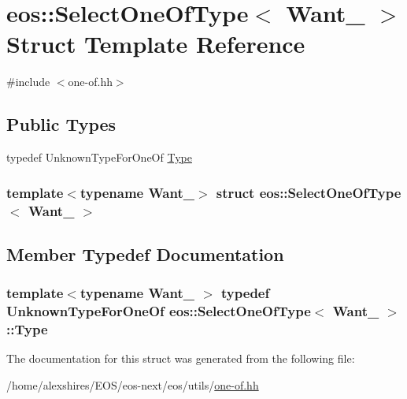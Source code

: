\hypertarget{structeos_1_1SelectOneOfType_3_01Want___01_4}{
\section{eos::SelectOneOfType$<$ Want\_\- $>$ Struct Template Reference}
\label{structeos_1_1SelectOneOfType_3_01Want___01_4}
}


{\ttfamily \#include $<$one-\/of.hh$>$}\subsection*{Public Types}
\begin{DoxyCompactItemize}
\item 
typedef UnknownTypeForOneOf \hyperlink{structeos_1_1SelectOneOfType_3_01Want___01_4_aa89f45e51d938a8ec8bf5bbfc41bafbc}{Type}
\end{DoxyCompactItemize}
\subsubsection*{template$<$typename Want\_\-$>$ struct eos::SelectOneOfType$<$ Want\_\- $>$}



\subsection{Member Typedef Documentation}
\hypertarget{structeos_1_1SelectOneOfType_3_01Want___01_4_aa89f45e51d938a8ec8bf5bbfc41bafbc}{
\subsubsection[{Type}]{\setlength{\rightskip}{0pt plus 5cm}template$<$typename Want\_\- $>$ typedef UnknownTypeForOneOf eos::SelectOneOfType$<$ Want\_\- $>$::{\bf Type}}}
\label{structeos_1_1SelectOneOfType_3_01Want___01_4_aa89f45e51d938a8ec8bf5bbfc41bafbc}


The documentation for this struct was generated from the following file:\begin{DoxyCompactItemize}
\item 
/home/alexshires/EOS/eos-\/next/eos/utils/\hyperlink{one-of_8hh}{one-\/of.hh}\end{DoxyCompactItemize}
